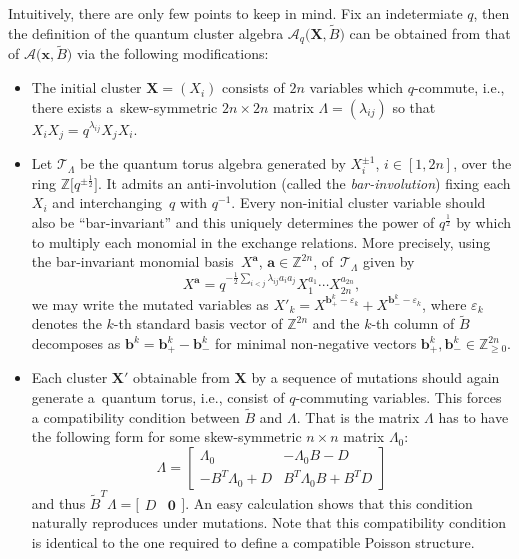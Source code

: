 \documentclass[pdftex]{sigma}
\newcommand{\bfa}{\mathbf{a}}
\newcommand{\bfb}{\mathbf{b}}
\newcommand{\bfx}{\mathbf{x}}
\newcommand{\bfX}{\mathbf{X}}
\newcommand{\cA}{\mathcal{A}}
\newcommand{\cT}{\mathcal{T}}
\newcommand{\half}{{\frac{1}{2}}}
\newcommand{\ZZ}{\mathbb{Z}}
\numberwithin{equation}{section}
\begin{document}
Intuitively, there are only few points to keep in mind. Fix an indetermiate $q$, then the definition of the quantum cluster algebra $\cA_q\big(\bfX,\widetilde B\big)$ can be obtained from that of $\cA\big(\bfx,\widetilde B\big)$ via the following modifications:
 \begin{itemize}\itemsep=0pt
\item The initial cluster $\bfX=(X_i)$ consists of $2n$ variables which $q$-commute, i.e., there exists a~skew-symmetric $2n\times 2n$ matrix $\Lambda=(\lambda_{ij})$ so that $X_iX_j=q^{\lambda_{ij}}X_jX_i$.
\item Let $\cT_\Lambda$ be the quantum torus algebra generated by $X_i^{\pm1}$, $i\in[1,2n]$, over the ring $\ZZ\big[q^{\pm\half}\big]$. It admits an anti-involution (called the {\it bar-involution}) fixing each $X_i$ and interchan\-ging~$q$ with $q^{-1}$. Every non-initial cluster variable should also be ``bar-invariant'' and this uniquely determines the power of $q^\half$ by which to multiply each monomial in the exchange relations. More precisely, using the bar-invariant monomial basis~$X^\bfa$, $\bfa\in\ZZ^{2n}$, of~$\cT_\Lambda$ given by
 \[
 X^\bfa=q^{-\half\sum\limits_{i<j}\lambda_{ij}a_ia_j}X_1^{a_1}\cdots X_{2n}^{a_{2n}},
 \]
we may write the mutated variables as $X'_k=X^{\bfb_+^k-\varepsilon_k}+X^{\bfb_-^k-\varepsilon_k}$, where $\varepsilon_k$ denotes the $k$-th standard basis vector of $\ZZ^{2n}$ and the $k$-th column of $\widetilde{B}$ decomposes as $\bfb^k=\bfb^k_+-\bfb^k_-$ for minimal non-negative vectors $\bfb^k_+,\bfb^k_-\in\ZZ_{\ge0}^{2n}$.
\item Each cluster $\bfX'$ obtainable from $\bfX$ by a sequence of mutations should again generate a~quantum torus, i.e., consist of $q$-commuting variables.
 This forces a compatibility condition between $\widetilde{B}$ and $\Lambda$. That is the matrix $\Lambda$ has to have the following form for some skew-symmetric $n\times n$ matrix $\Lambda_0$:
 \[
 \Lambda = \left[ \begin{matrix}
 \Lambda_0 & -\Lambda_0B-D\\
 -B^T\Lambda_0+D & B^T\Lambda_0B+B^TD
 \end{matrix}
 \right]
 \]
 and thus $\widetilde{B}^T\Lambda=\big[\begin{matrix} D & \boldsymbol{0}\end{matrix}\big]$. An easy calculation shows that this condition naturally reproduces under mutations.
 Note that this compatibility condition is identical to the one required to define a compatible Poisson structure.
 \end{itemize}
\end{document}
